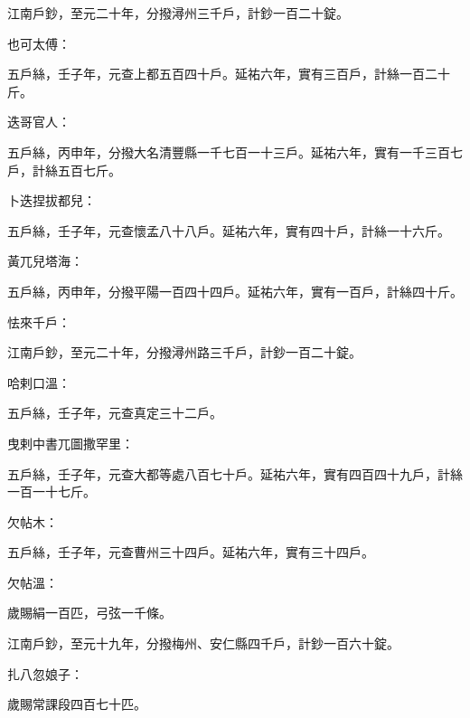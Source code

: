 \begin{pinyinscope}
 江南戶鈔，至元二十年，分撥潯州三千戶，計鈔一百二十錠。



 也可太傅：



 五戶絲，壬子年，元查上都五百四十戶。延祐六年，實有三百戶，計絲一百二十斤。



 迭哥官人：



 五戶絲，丙申年，分撥大名清豐縣一千七百一十三戶。延祐六年，實有一千三百七戶，計絲五百七斤。



 卜迭捏拔都兒：



 五戶絲，壬子年，元查懷孟八十八戶。延祐六年，實有四十戶，計絲一十六斤。



 黃兀兒塔海：



 五戶絲，丙申年，分撥平陽一百四十四戶。延祐六年，實有一百戶，計絲四十斤。



 怯來千戶：



 江南戶鈔，至元二十年，分撥潯州路三千戶，計鈔一百二十錠。



 哈剌口溫：



 五戶絲，壬子年，元查真定三十二戶。



 曳剌中書兀圖撒罕里：



 五戶絲，壬子年，元查大都等處八百七十戶。延祐六年，實有四百四十九戶，計絲一百一十七斤。



 欠帖木：



 五戶絲，壬子年，元查曹州三十四戶。延祐六年，實有三十四戶。



 欠帖溫：



 歲賜絹一百匹，弓弦一千條。



 江南戶鈔，至元十九年，分撥梅州、安仁縣四千戶，計鈔一百六十錠。



 扎八忽娘子：



 歲賜常課段四百七十匹。




\end{pinyinscope}
